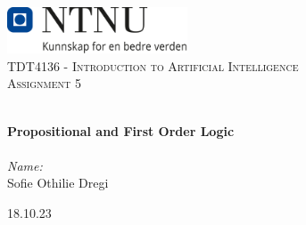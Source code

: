 
\begin{titlepage}
\vbox{ }
\vbox{ }
\begin{center}
\includegraphics[width=0.40\textwidth]{Images/NTNU_logo.png}\\[1cm]
\textsc{\Large TDT4136 - Introduction to Artificial Intelligence}\\[0.5cm]
\textsc{\Large Assignment 5}\\[0.5cm]
\vbox{ }


\HRule \\[0.4cm]
{ \huge \bfseries Propositional and First Order Logic}\\[0.4cm]
\HRule \\[1.5cm]

\large
\emph{Name:}\\
Sofie Othilie Dregi

\vfill

{\large 18.10.23}
\end{center}
\end{titlepage}
